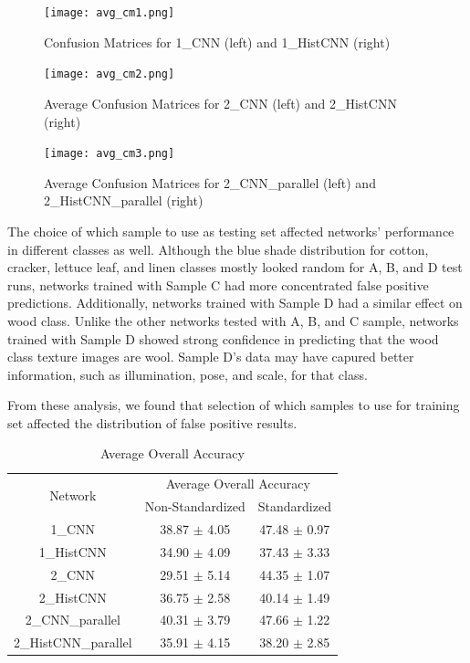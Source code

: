 \documentclass[10pt,twocolumn,letterpaper]{article}
\begin{document}
\begin{figure}[t]
	\texttt{[image: avg\_cm1.png]}
	\caption{Confusion Matrices for 1\_CNN (left) and 1\_HistCNN (right)}
	\label{fig:cm1}
\end{figure}

\begin{figure}[t]
	\texttt{[image: avg\_cm2.png]}
	\caption{Average Confusion Matrices for 2\_CNN (left) and 2\_HistCNN (right)}
	\label{fig:cm2}
\end{figure}

\begin{figure}[t]
	\texttt{[image: avg\_cm3.png]}
	\caption{Average Confusion Matrices for 2\_CNN\_parallel (left) and 2\_HistCNN\_parallel (right)}
	\label{fig:cm2p}
\end{figure}

The choice of which sample to use as testing set affected networks' performance in different classes as well. Although the blue shade distribution for cotton, cracker, lettuce leaf, and linen classes mostly looked random for A, B, and D test runs, networks trained with Sample C had more concentrated false positive predictions. Additionally, networks trained with Sample D had a similar effect on wood class. Unlike the other networks tested with A, B, and C sample, networks trained with Sample D showed strong confidence in predicting that the wood class texture images are wool. Sample D's data may have capured better information, such as illumination, pose, and scale, for that class.

From these analysis, we found that selection of which samples to use for training set affected the distribution of false positive results.

\begin{table}[t]
	\begin{tabular}{@{}ccc@{}}
		\toprule
		\multirow{2}{*}{Network} & \multicolumn{2}{c}{Average Overall Accuracy} \\ \cmidrule(l){2-3} 
		& Non-Standardized & Standardized \\ \midrule
		1\_CNN & 38.87 $\pm$ 4.05 & 47.48 $\pm$ 0.97 \\
		1\_HistCNN & 34.90 $\pm$ 4.09 & 37.43 $\pm$ 3.33 \\
		2\_CNN & 29.51 $\pm$ 5.14 & 44.35 $\pm$ 1.07 \\
		2\_HistCNN & 36.75 $\pm$ 2.58 & 40.14 $\pm$ 1.49 \\
		2\_CNN\_parallel & 40.31 $\pm$ 3.79 & 47.66 $\pm$ 1.22 \\
		2\_HistCNN\_parallel & 35.91 $\pm$ 4.15 & 38.20 $\pm$ 2.85 \\ \bottomrule
	\end{tabular}
	\caption{Average Overall Accuracy}
	\label{tab:accuracy}
\end{table}
\end{document}
